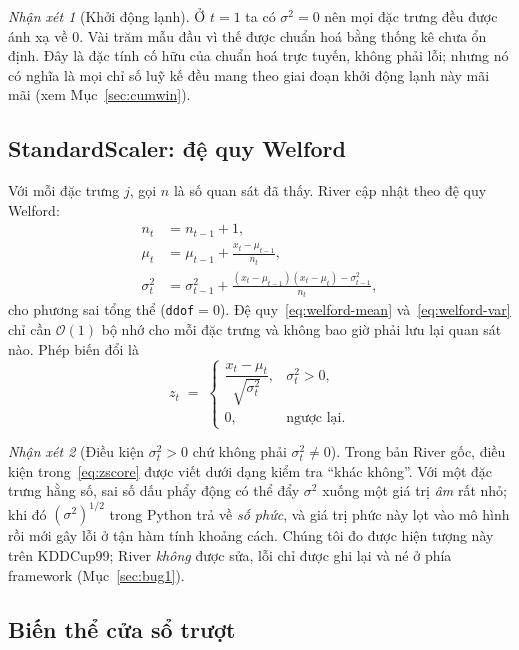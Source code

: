 \documentclass[11pt,a4paper]{article}
\theoremstyle{remark}
\newtheorem{remark}{Nhận xét}
\begin{document}
\begin{remark}[Khởi động lạnh]
Ở $t=1$ ta có $\sigma^2=0$ nên mọi đặc trưng đều được ánh xạ về $0$. Vài trăm mẫu
đầu vì thế được chuẩn hoá bằng thống kê chưa ổn định. Đây là đặc tính cố hữu của
chuẩn hoá trực tuyến, không phải lỗi; nhưng nó có nghĩa là mọi chỉ số luỹ kế đều
mang theo giai đoạn khởi động lạnh này mãi mãi (xem Mục~\ref{sec:cumwin}).
\end{remark}

\subsection{StandardScaler: đệ quy Welford}

Với mỗi đặc trưng $j$, gọi $n$ là số quan sát đã thấy. River cập nhật theo
đệ quy Welford:
\begin{align}
  n_t &= n_{t-1} + 1, \\
  \mu_t &= \mu_{t-1} + \frac{x_t - \mu_{t-1}}{n_t},
  \label{eq:welford-mean}\\
  \sigma^2_t &= \sigma^2_{t-1}
    + \frac{(x_t - \mu_{t-1})(x_t - \mu_t) - \sigma^2_{t-1}}{n_t},
  \label{eq:welford-var}
\end{align}
cho phương sai tổng thể (\texttt{ddof}$=0$). Đệ quy~\eqref{eq:welford-mean}
và~\eqref{eq:welford-var} chỉ cần $\mathcal{O}(1)$ bộ nhớ cho mỗi đặc trưng và
không bao giờ phải lưu lại quan sát nào. Phép biến đổi là
\begin{equation}
  \label{eq:zscore}
  z_t \;=\;
  \begin{cases}
    \dfrac{x_t - \mu_t}{\sqrt{\sigma^2_t}}, & \sigma^2_t > 0,\\[6pt]
    0, & \text{ngược lại}.
  \end{cases}
\end{equation}

\begin{remark}[Điều kiện $\sigma^2_t>0$ chứ không phải $\sigma^2_t \neq 0$]
\label{rem:guard}
Trong bản River gốc, điều kiện trong~\eqref{eq:zscore} được viết dưới dạng kiểm
tra ``khác không''. Với
một đặc trưng hằng số, sai số dấu phẩy động có thể đẩy $\sigma^2$ xuống một giá
trị \emph{âm} rất nhỏ; khi đó $(\sigma^2)^{1/2}$ trong Python trả về \emph{số
phức}, và giá trị phức này lọt vào mô hình rồi mới gây lỗi ở tận hàm tính khoảng
cách. Chúng tôi đo được hiện tượng này trên KDDCup99; River \emph{không} được sửa,
lỗi chỉ được ghi lại và né ở phía framework (Mục~\ref{sec:bug1}).
\end{remark}

\subsection{Biến thể cửa sổ trượt}
\end{document}
